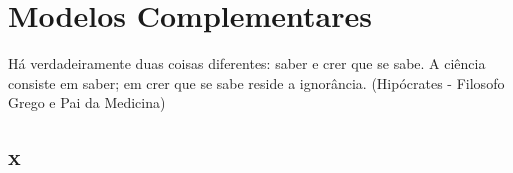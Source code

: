 \chapter{Modelos Complementares}

\begin{remark}
Há verdadeiramente duas coisas diferentes: saber e crer que se sabe. A ciência consiste em saber; em crer que se sabe reside a ignorância. (Hipócrates - Filosofo Grego e Pai da Medicina) 
\end{remark}

\section{x}

\clearpage
